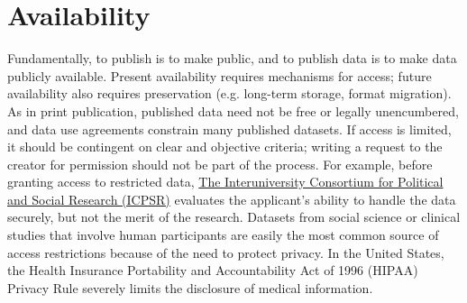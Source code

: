 \documentclass[10pt,a4paper,twocolumn]{article}
\begin{document}
\section*{Availability}\label{availability}

Fundamentally, to publish is to make public, and to publish data is to make data publicly available.
Present availability requires mechanisms for access; future availability also requires preservation (e.g. long-term storage, format migration)\cite{waters_preserving_1996, beagrie_digital_2008, gray_online_2002}.
As in print publication, published data need not be free or legally unencumbered, and data use agreements constrain many published datasets.
If access is limited, it should be contingent on clear and objective criteria; writing a request to the creator for permission should not be part of the process.
For example, before granting access to restricted data, \href{http://www.icpsr.umich.edu/icpsrweb/content/deposit/confidentiality.html}{The Interuniversity Consortium for Political and Social Research (ICPSR)} evaluates the applicant's ability to handle the data securely, but not the merit of the research.
Datasets from social science or clinical studies that involve human participants are easily the most common source of access restrictions because of the need to protect privacy.
In the United States, the Health Insurance Portability and Accountability Act of 1996 (HIPAA) Privacy Rule severely limits the disclosure of medical information\cite{office_for_civil_rights_renal_2003}.
\end{document}
